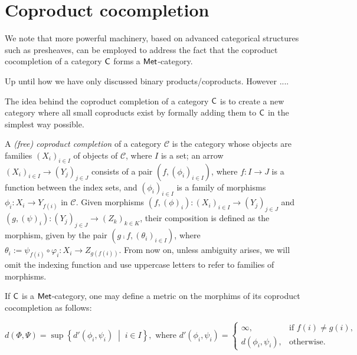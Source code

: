 \section{Coproduct cocompletion}

We note that more powerful machinery, based on advanced categorical structures such as presheaves, can be employed to address the fact that the coproduct cocompletion of a category $\mathsf{C}$ forms a $\mathsf{Met}$-category. 


Up until how we have only discussed binary products/coproducts. However ....

The idea behind the coproduct completion of a category $\mathsf{C}$ is to create a new category where all small coproducts exist by formally adding them to $\mathsf{C}$  in the simplest way possible.

\begin{definition}
  A \emph{(free) coproduct completion} of a category \(\mathcal{C}\) is the category whose objects are families \((X_i)_{i \in I}\) of objects of \(\mathcal{C}\), where \(I\) is a set; an arrow \((X_i)_{i \in I} \to (Y_j)_{j \in J}\) consists of a pair \((f, (\phi_i)_{i \in I})\), where \(f : I \to J\) is a function between the index sets, and \((\phi_i)_{i \in I}\) is a family of morphisms \(\phi_i : X_i \to Y_{f(i)}\) in \(\mathcal{C}\). Given morphisms $(f,(\phi)_i): (X_i)_{i \in I} \to (Y_j)_{j \in J}$ and $(g,(\psi)_i): (Y_j)_{j \in J} \to (Z_k)_{k \in K}$, their composition is defined as the morphism, given by the pair \((g \comp f, (\theta_i)_{i \in I})\), where $ \theta_i := \psi_{f(i)} \circ \varphi_i : X_i \to Z_{g(f(i))}$. From now on, unless ambiguity arises, we will omit the indexing function and use uppercase letters to refer to families of morphisms.
\end{definition}

If $\mathsf{C}$ is a $\mathsf{Met}$-category, one may define a metric on the morphims of its coproduct cocompletion as follows:

\begin{equation*}
  d(\Phi, \Psi) = \sup \left\{ d'(\phi_i, \psi_i) \;\middle\vert\; i \in I \right\},\text{ where } 
  d'(\phi_i, \psi_i) 
  = 
  \begin{cases}
    \infty, & \text{if } f(i) \neq g(i), \\
    d(\phi_i, \psi_i), & \text{otherwise}.
  \end{cases}
\end{equation*}





